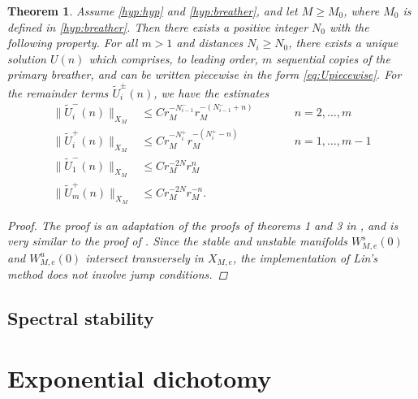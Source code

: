 \documentclass[12pt,reqno]{amsart}
\newtheorem{theorem}{Theorem}
\begin{document}
\begin{theorem}\label{th:multibreathers}
Assume \cref{hyp:hyp} and \cref{hyp:breather}, and let $M \geq M_0$, where $M_0$ is defined in \cref{hyp:breather}. Then there exists a positive integer $N_0$ with the following property. For all $m > 1$ and distances $N_i \geq N_0$, there exists a unique solution $U(n)$ which comprises, to leading order, $m$ sequential copies of the primary breather, and can be written piecewise in the form \cref{eq:Upiecewise}. For the remainder terms $\tilde{U}_i^\pm(n)$, we have the estimates
\begin{equation}\label{eq:Uestimates}
\begin{aligned}
\| \tilde{U}_i^-(n)\|_{X_M} &\leq C r_M^{-N_{i-1}^-} r_M^{-(N_{i-1}^- + n)} && \qquad n = 2, \dots, m\\
\|\tilde{U}_i^+(n) \|_{X_M} &\leq C r_M^{-N_i^+} r_M^{-(N_i^+ - n)} && \qquad n = 1, \dots, m-1 \\
\| \tilde{U}_1^-(n)\|_{X_M} &\leq C r_M^{-2N} r_M^{n} \\
\|\tilde{U}_m^+(n) \|_{X_M} &\leq C r_M^{-2N} r_M^{-n} .
\end{aligned}
\end{equation}
\begin{proof}
The proof is an adaptation of the proofs of theorems 1 and 3 in \cite{Parker2020}, and is very similar to the proof of \cite[Theorem 1]{Parker2021}. Since the stable and unstable manifolds $W_{M,e}^s(0)$ and $W_{M,e}^u(0)$ intersect transversely in $X_{M,e}$, the implementation of Lin's method does not involve jump conditions.
\end{proof}
\end{theorem}



\subsection{Spectral stability}

\section{Exponential dichotomy}
\end{document}
